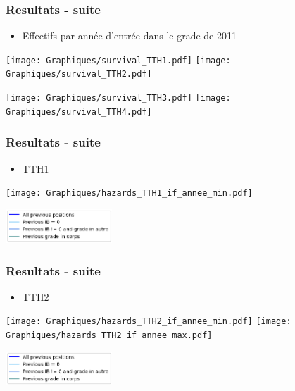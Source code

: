 \documentclass[xcolor=table,ignorenonframetext,12pt]{beamer}
\begin{document}
\begin{frame}
\frametitle{Resultats - suite}
\begin{itemize}
	\item Effectifs par année d'entrée dans le grade de 2011
\end{itemize}
\begin{center}
	\texttt{[image: Graphiques/survival\_TTH1.pdf]}
	\texttt{[image: Graphiques/survival\_TTH2.pdf]}
\end{center}
\begin{center}
	\texttt{[image: Graphiques/survival\_TTH3.pdf]}
	\texttt{[image: Graphiques/survival\_TTH4.pdf]}
\end{center}

\end{frame}


\begin{frame}
\frametitle{Resultats - suite}
\begin{itemize}
	\item TTH1
\end{itemize}
\begin{center}
		\texttt{[image: Graphiques/hazards\_TTH1\_if\_annee\_min.pdf]}
\end{center}
\begin{center}
		\includegraphics[width=0.3\textwidth]{Graphiques/legend.png}
\end{center}
\end{frame}

\begin{frame}
\frametitle{Resultats - suite}
\begin{itemize}
	\item TTH2
\end{itemize}
	\begin{center}
	\texttt{[image: Graphiques/hazards\_TTH2\_if\_annee\_min.pdf]}
	\texttt{[image: Graphiques/hazards\_TTH2\_if\_annee\_max.pdf]}
\end{center}
\begin{center}
	\includegraphics[width=0.3\textwidth]{Graphiques/legend.png}
\end{center}

\end{frame}
\end{document}

